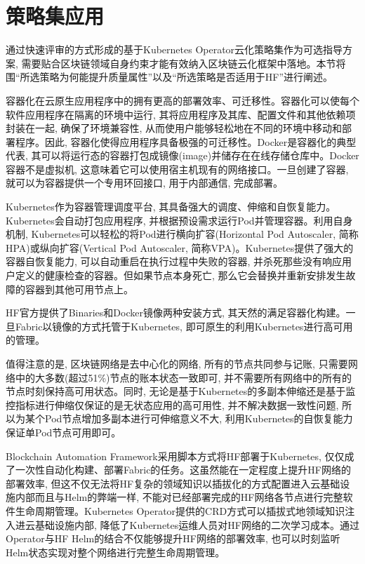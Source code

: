 \section{策略集应用}\label{section: policy_set_application}

通过快速评审的方式形成的基于Kubernetes Operator云化策略集作为可选指导方案, 需要贴合区块链领域自身约束才能有效纳入区块链云化框架中落地。本节将围“所选策略为何能提升质量属性”以及“所选策略是否适用于HF”进行阐述。

容器化在云原生应用程序中的拥有更高的部署效率\cite{zhou2021container}、可迁移性。容器化可以使每个软件应用程序在隔离的环境中运行, 其将应用程序及其库、配置文件和其他依赖项封装在一起, 确保了环境兼容性, 从而使用户能够轻松地在不同的环境中移动和部署程序。因此, 容器化使得应用程序具备极强的可迁移性。Docker\footnotemark[1]是容器化的典型代表, 其可以将运行态的容器打包成镜像(image)并储存在在线存储仓库中。Docker容器不是虚拟机, 这意味着它可以使用宿主机现有的网络接口\cite{shah2019building}。一旦创建了容器, 就可以为容器提供一个专用环回接口, 用于内部通信, 完成部署。

Kubernetes作为容器管理调度平台, 其具备强大的调度、伸缩和自恢复能力。Kubernetes会自动打包应用程序, 并根据预设需求运行Pod并管理容器。利用自身机制, Kubernetes可以轻松的将Pod进行横向扩容(Horizontal Pod Autoscaler, 简称HPA)或纵向扩容(Vertical Pod Autoscaler, 简称VPA)。Kubernetes提供了强大的容器自恢复能力, 可以自动重启在执行过程中失败的容器, 并杀死那些没有响应用户定义的健康检查的容器。但如果节点本身死亡, 那么它会替换并重新安排发生故障的容器到其他可用节点上。

HF官方提供了Binaries和Docker镜像两种安装方式\footnotemark[1], 其天然的满足容器化构建。一旦Fabric以镜像的方式托管于Kubernetes, 即可原生的利用Kubernetes进行高可用的管理。

值得注意的是, 区块链网络是去中心化的网络, 所有的节点共同参与记账, 只需要网络中的大多数(超过51\%)节点的账本状态一致即可, 并不需要所有网络中的所有的节点时刻保持高可用状态。同时, 无论是基于Kubernetes的多副本伸缩还是基于监控指标进行伸缩仅保证的是无状态应用的高可用性, 并不解决数据一致性问题, 所以为某个Pod节点增加多副本进行可伸缩意义不大, 利用Kubernetes的自恢复能力保证单Pod节点可用即可。

Blockchain Automation Framework采用脚本方式将HF部署于Kubernetes, 仅仅成了一次性自动化构建、部署Fabric的任务。这虽然能在一定程度上提升HF网络的部署效率, 但这不仅无法将HF复杂的领域知识以插拔化的方式配置进入云基础设施内部而且与Helm的弊端一样, 不能对已经部署完成的HF网络各节点进行完整软件生命周期管理。Kubernetes Operator提供的CRD方式可以插拔式地领域知识注入进云基础设施内部, 降低了Kubernetes运维人员对HF网络的二次学习成本。通过Operator与HF Helm的结合不仅能够提升HF网络的部署效率, 也可以时刻监听Helm状态实现对整个网络进行完整生命周期管理。

